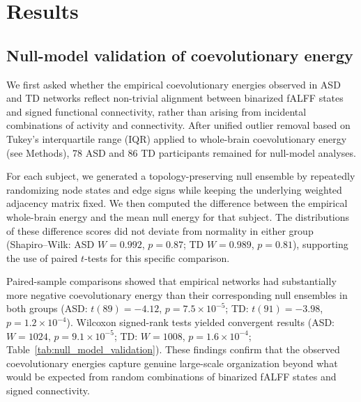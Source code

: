 \documentclass[10pt,letterpaper]{article}
\begin{document}
\section*{Results}

\subsection*{Null-model validation of coevolutionary energy}

We first asked whether the empirical coevolutionary energies observed in ASD and TD networks reflect
non-trivial alignment between binarized fALFF states and signed functional connectivity, rather than
arising from incidental combinations of activity and connectivity. After unified outlier removal
based on Tukey's interquartile range (IQR) applied to whole-brain coevolutionary energy (see
Methods), 78 ASD and 86 TD participants remained for null-model analyses.

For each subject, we generated a topology-preserving null ensemble by repeatedly randomizing node
states and edge signs while keeping the underlying weighted adjacency matrix fixed. We then computed
the difference between the empirical whole-brain energy and the mean null energy for that subject.
The distributions of these difference scores did not deviate from normality in either group
(Shapiro--Wilk: ASD $W = 0.992$, $p = 0.87$; TD $W = 0.989$, $p = 0.81$), supporting the use
of paired $t$-tests for this specific comparison.

Paired-sample comparisons showed that empirical networks had substantially more negative
coevolutionary energy than their corresponding null ensembles in both groups (ASD: $t(89) = -4.12$,
$p = 7.5 \times 10^{-5}$; TD: $t(91) = -3.98$, $p = 1.2 \times 10^{-4}$). Wilcoxon signed-rank
tests yielded convergent results (ASD: $W = 1024$, $p = 9.1 \times 10^{-5}$; TD: $W = 1008$,
$p = 1.6 \times 10^{-4}$; Table~\ref{tab:null_model_validation}). These findings confirm that the
observed coevolutionary energies capture genuine large-scale organization beyond what would be
expected from random combinations of binarized fALFF states and signed connectivity.
\end{document}
